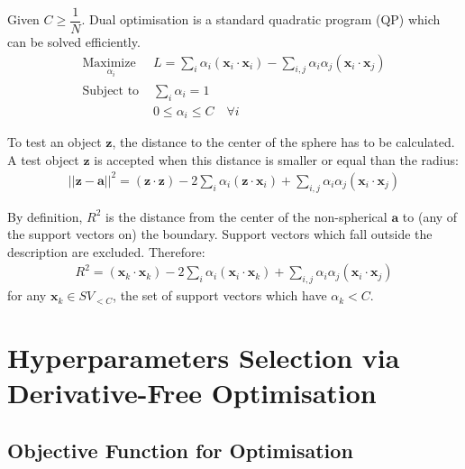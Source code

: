 \documentclass[3p,times]{elsarticle}
\begin{document}
Given $C \ge \dfrac{1}{N}$. Dual optimisation is a standard quadratic program (QP) which can be solved efficiently.
\begin{subequations}\label{eq:svdd_dual}
\begin{align}
\underset{
	\begin{array}{c}
		 \alpha_i
	\end{array}}{\text{Maximize }} & L = \sum_i \alpha_i \left( \mathbf{x}_i \cdot \mathbf{x}_i \right) - \sum_{i,j} \alpha_i \alpha_j \left( \mathbf{x}_i \cdot \mathbf{x}_j \right)\\
\text{Subject to } & \sum_i \alpha_i = 1\\
& 0 \le \alpha_i \le C \quad \forall i
\end{align}
\end{subequations}

To test an object $\mathbf{z}$, the distance to the center of the sphere has to be calculated. A test
object $\mathbf{z}$ is accepted when this distance is smaller or equal than the radius:
\begin{align}
\left|\left| \mathbf{z} - \mathbf{a} \right|\right|^2 = \left( \mathbf{z} \cdot \mathbf{z} \right) - 2 \sum_i \alpha_i \left( \mathbf{z} \cdot \mathbf{x}_i \right) + \sum_{i,j} \alpha_i \alpha_j \left( \mathbf{x}_i \cdot \mathbf{x}_j \right)
\end{align}

By definition, $R^2$ is the distance from the center of the non-spherical $\mathbf{a}$ to (any of the support vectors on) the boundary. Support vectors which fall outside the description are excluded. Therefore:
\begin{align}
R^2 = \left( \mathbf{x}_k \cdot \mathbf{x}_k \right) - 2 \sum_i \alpha_i \left( \mathbf{x}_i \cdot \mathbf{x}_k \right) + \sum_{i,j} \alpha_i \alpha_j \left( \mathbf{x}_i \cdot \mathbf{x}_j \right)
\end{align}
for any $\mathbf{x}_k \in SV_{<C}$, the set of support vectors which have $\alpha_k < C$.

\section{Hyperparameters Selection via Derivative-Free Optimisation}

\subsection{Objective Function for Optimisation}
\end{document}
